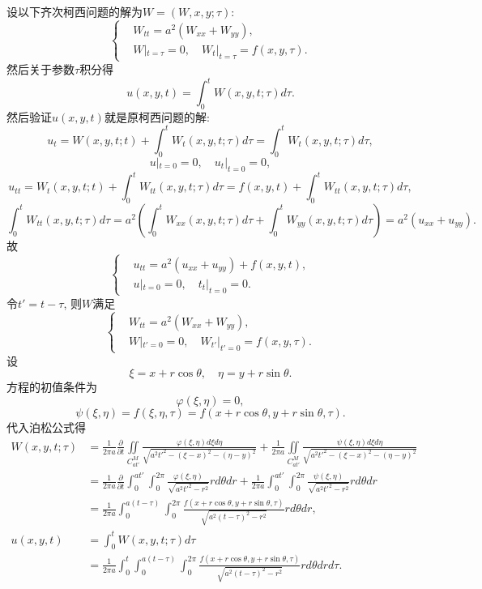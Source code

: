 \documentclass[11pt,a4paper]{article}
\begin{document}
设以下齐次柯西问题的解为$W=(W,x,y;\tau)$:
$$\left\{\begin{aligned}
     & W_{tt}=a^2(W_{xx}+W_{yy}), \\
     & W|_{t=\tau}=0,\quad
    W_t|_{t=\tau}=f(x,y,\tau).
  \end{aligned}\right.$$
然后关于参数$\tau$积分得
$$u(x,y,t)=\int_0^t W(x,y,t;\tau) d\tau.$$
然后验证$u(x,y,t)$就是原柯西问题的解:
$$u_t=W(x,y,t;t)+\int_0^t W_t(x,y,t;\tau) d\tau=\int_0^t W_t(x,y,t;\tau) d\tau,$$
$$u|_{t=0}=0,\quad u_t|_{t=0}=0,$$
$$u_{tt}=W_t(x,y,t;t)+\int_0^t W_{tt}(x,y,t;\tau) d\tau=f(x,y,t)+\int_0^t W_{tt}(x,y,t;\tau) d\tau,$$
$$\int_0^t W_{tt}(x,y,t;\tau) d\tau=a^2\left(\int_0^t W_{xx}(x,y,t;\tau) d\tau+\int_0^t W_{yy}(x,y,t;\tau) d\tau\right)=a^2(u_{xx}+u_{yy}).$$
故
$$\left\{\begin{aligned}
     & u_{tt}=a^2(u_{xx}+u_{yy})+f(x,y,t), \\
     & u|_{t=0}=0, \quad
    t_t|_{t=0}=0.
  \end{aligned}\right.$$
令$t'=t-\tau$, 则$W$满足
$$\left\{\begin{aligned}
     & W_{tt}=a^2(W_{xx}+W_{yy}), \\
     & W|_{t'=0}=0,\quad
    W_{t'}|_{t'=0}=f(x,y,\tau).
  \end{aligned}\right.$$
设
$$\xi=x+r\cos\theta,\quad \eta=y+r\sin\theta.$$
方程的初值条件为
$$\varphi(\xi,\eta)=0,$$
$$\psi(\xi,\eta)=f(\xi,\eta,\tau)=f(x+r\cos\theta,y+r\sin\theta,\tau).$$
代入泊松公式得
\begin{align*}
  W(x,y,t;\tau)
   & =\frac{1}{2\pi a}\frac{\partial}{\partial t}\iint\limits_{C_{at'}^M}\frac{\varphi(\xi,\eta)d\xi d\eta}{\sqrt{a^2t'^2-(\xi-x)^2-(\eta-y)^2}}+
  \frac{1}{2\pi a}\iint\limits_{C_{at'}^M}\frac{\psi(\xi,\eta)d\xi d\eta}{\sqrt{a^2t'^2-(\xi-x)^2-(\eta-y)^2}}                                     \\
   & =\frac{1}{2\pi a}\frac{\partial}{\partial t}\int_0^{at'}\int_0^{2\pi}\frac{\varphi(\xi,\eta)}{\sqrt{a^2t'^2-r^2}}rd\theta dr+
  \frac{1}{2\pi a}\int_0^{at'}\int_0^{2\pi}\frac{\psi(\xi,\eta)}{\sqrt{a^2t'^2-r^2}}rd\theta dr                                                    \\
   & =\frac{1}{2\pi a}\int_0^{a(t-\tau)}\int_0^{2\pi}\frac{f(x+r\cos\theta,y+r\sin\theta,\tau)}{\sqrt{a^2(t-\tau)^2-r^2}}rd\theta dr,              \\
  u(x,y,t)
   & =\int_0^t W(x,y,t;\tau) d\tau                                                                                                                 \\
   & =\frac{1}{2\pi a}\int_0^t\int_0^{a(t-\tau)}\int_0^{2\pi}\frac{f(x+r\cos\theta,y+r\sin\theta,\tau)}{\sqrt{a^2(t-\tau)^2-r^2}}rd\theta drd\tau.
\end{align*}
\end{document}

